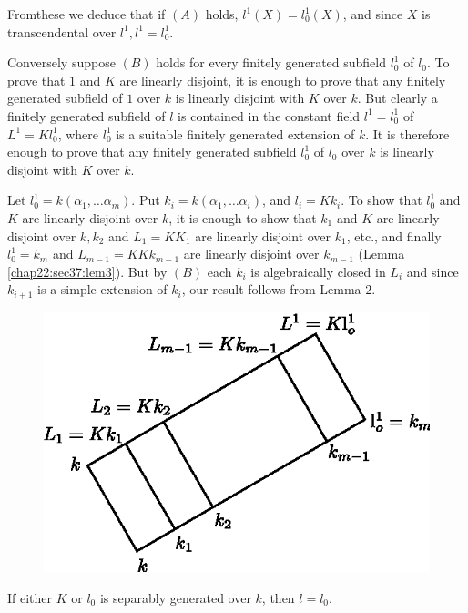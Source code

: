 From\pageoriginale these we deduce that if $(A)$ holds, $l^1 (X) = l^1_0 (X)$, and
since $X$ is transcendental over $l^1 , l^1 = l^1_0$. 

Conversely suppose $(B)$ holds for every finitely generated subfield
$l^1_0$ of $l_0$. To prove that $1$ and $K$ are linearly disjoint, it
is enough to prove that any finitely generated subfield of $1$ over
$k$ is linearly disjoint with $K$ over $k$. But clearly a  finitely
generated subfield of $l$ is contained in the constant field $l^1 =
l^1_0$ of $L^1 = Kl^1_0$, where $l^1_0$ is a suitable finitely
generated extension of $k$. It is therefore enough to prove that any
finitely generated subfield $l^1_0$ of $l_0$ over $k$ is linearly
disjoint with $K$ over $k$. 

Let $l^1_0 = k(\alpha_1 , \ldots \alpha_m)$. Put $k_i = k(\alpha_1 ,
\ldots \alpha_i)$, and $l_i = K k_i$. To show that $l^1_0$ and $K$ are
linearly disjoint over $k$, it is enough to show that $k_1$ and $K$
are linearly disjoint over $k, k_2$ and $L_1 = K K_1$ are linearly
disjoint over $k_1$, etc., and finally $l^1_0 = k_m$ and $L_{m - 1} =
K Kk_{m - 1}$ are linearly disjoint over $k_{m-1}$ (Lemma \ref{chap22:sec37:lem3}). But by
$(B)$ each $k_i$ is algebraically closed in $L_i$ and since $k_{i + 1}
$ is a simple extension of $k_i$, our result follows from Lemma $2$. 
  \begin{figure}[H]
    \centerline{\includegraphics{vol18-figures/fig18.2.eps}}
  \end{figure}

\begin{coro*}%
  If either $K$ or $l_0$ is separably generated over $k$, then $l=l_0$.
\end{coro*}

